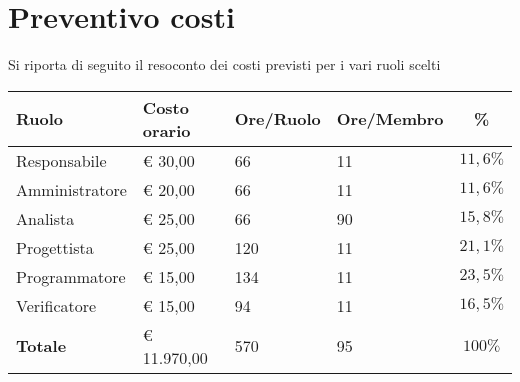 \section{Preventivo costi}
Si riporta di seguito il resoconto dei costi previsti per i vari ruoli scelti

\begin{center}
    \begin{tabular}{|l|l|l|l|c|}
        \hline
        \textbf{Ruolo} & \textbf{Costo orario} & \textbf{Ore/Ruolo} & \textbf{Ore/Membro} & \textbf{\%} \\
        \hline
        Responsabile & \euro{} 30,00 & 66 & 11 & $11,6\%$ \\
        \hline
        Amministratore & \euro{} 20,00 & 66 & 11 & $11,6\%$ \\
        \hline
        Analista & \euro{} 25,00 & 66 & 90 & $15,8\%$ \\
        \hline
        Progettista & \euro{} 25,00 & 120 & 11 & $21,1\%$ \\
        \hline
        Programmatore & \euro{} 15,00 & 134 & 11 & $23,5\%$ \\
        \hline
        Verificatore & \euro{} 15,00 & 94 & 11 & $16,5\%$ \\
        \hline
        \textbf{Totale} & \euro{} 11.970,00 & 570 & 95 & $100\%$ \\
        \hline
    \end{tabular}
\end{center}
